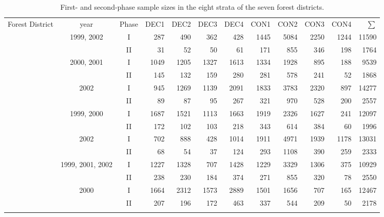 \begin{table*}
\begin{center}
\tiny{
\caption{First- and second-phase sample sizes in the eight strata of the seven forest districts.}
\label{tab:table_1}
\begin{tabular}{lccrrrrrrrrr}
\hline\noalign{\smallskip}
 Forest \linebreak District & year & Phase & DEC1 & DEC2 & DEC3 & DEC4 & CON1 & CON2 & CON3 & CON4 & $\sum$\\
\noalign{\smallskip}\hline\noalign{\smallskip}

\multirow{2}{*}{Clausthal} &\multirow{2}{*}{1999, 2002} &  I  &  287 & 490 &  362 &  428 & 1445 &  5084 &  2250 &  1244 & 11590\\
		     && II  &  31 &  52 &  50 &  61 &  171 &  855 &  346 &   198 & 1764\\
\hline\noalign{\smallskip}
\multirow{2}{*}{Dassel} &\multirow{2}{*}{2000, 2001} &  I  &  1049 & 1205 &  1327 &  1613 & 1334 &  1928 &  895 &  188 & 9539\\
		     && II  &  145 &  132 &  159 &  280 &  281 &  578 &  241 &   52 & 1868\\
\hline\noalign{\smallskip}
\multirow{2}{*}{Lauterberg} &\multirow{2}{*}{2002} &  I  &  945 & 1269 &  1139 &  2091 & 1833 &  3783 &  2320 &  897 & 14277\\
		     && II  &  89 &  87 &  95 &  267 &  321 &  970 &  528 &   200 & 2557\\
\hline\noalign{\smallskip}
\multirow{2}{*}{Neuhaus} &\multirow{2}{*}{1999, 2000} &  I  &  1687 & 1521 &  1113 &  1663 & 1919 &  2326 &  1627 &  241 & 12097\\
		     && II  &  172 &  102 &  103 &  218 &  343 &  614 &  384 &   60 & 1996\\
\hline\noalign{\smallskip}
\multirow{2}{*}{Riefensbeek} &\multirow{2}{*}{2002} &  I  &  702 & 888 &  428 &  1014 & 1911 &  4971 &  1939 &  1178 & 13031\\
		     && II  &  68 &  54 &  37 &  124 &  293 &  1108 &  390 &   259 & 2333\\
\hline\noalign{\smallskip}
\multirow{2}{*}{Seesen} &\multirow{2}{*}{1999, 2001, 2002} &  I  &  1227 & 1328 &  707 &  1428 & 1229 &  3329 &  1306 &  375 & 10929\\
		     && II  &  238 &  230 &  184 &  374 &  271 &  855 &  320 &   78 & 2550\\
\hline\noalign{\smallskip}
\multirow{2}{*}{Winnefeld} &\multirow{2}{*}{2000} &  I  &  1664 & 2312 & 1573 & 2889 & 1501 & 1656 & 707 &  165 & 12467\\
		     && II  &  207 &  196 &  172 &  463 & 337 &  544 & 209 &  50 & 2178\\ 
\noalign{\smallskip}\hline
\end{tabular}}
\end{center}
\end{table*}

